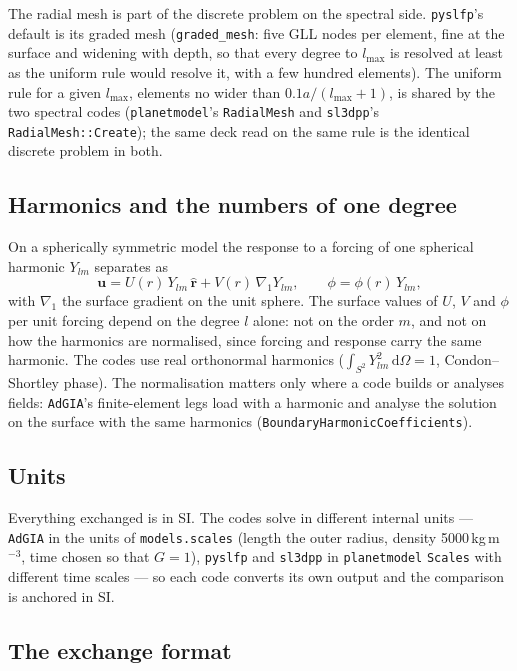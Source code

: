 \documentclass[11pt]{article}
\numberwithin{equation}{section}
\newcommand{\vu}{\mathbf{u}}
\newcommand{\rhat}{\hat{\mathbf{r}}}
\newcommand{\code}[1]{\texttt{#1}}
\newcommand{\Ylm}{Y_{lm}}
\newcommand{\gradone}{\nabla_{1}}
\begin{document}
The radial mesh is part of the discrete problem on the spectral side.
\code{pyslfp}'s default is its graded mesh (\code{graded\_mesh}: five GLL
nodes per element, fine at the surface and widening with depth, so that
every degree to $l_{\max}$ is resolved at least as the uniform rule would
resolve it, with a few hundred elements). The uniform rule for a given
$l_{\max}$, elements no wider than $0.1a/(l_{\max}+1)$, is shared by the two
spectral codes
(\code{planetmodel}'s \code{RadialMesh} and \code{sl3dpp}'s
\code{RadialMesh::Create}); the same deck read on the same rule is the
identical discrete problem in both.

\subsection{Harmonics and the numbers of one degree}
\label{sec:harmonics}

On a spherically symmetric model the response to a forcing of one
spherical harmonic $\Ylm$ separates as
\begin{equation}
  \vu = U(r)\,\Ylm\,\rhat + V(r)\,\gradone\Ylm,
  \qquad \phi = \phi(r)\,\Ylm,
  \label{eq:separation}
\end{equation}
with $\gradone$ the surface gradient on the unit sphere. The surface values
of $U$, $V$ and $\phi$ per unit forcing depend on the degree $l$ alone: not
on the order $m$, and not on how the harmonics are normalised, since forcing
and response carry the same harmonic. The codes use real orthonormal
harmonics ($\int_{S^2}\Ylm^2\,\mathrm{d}\Omega=1$, Condon--Shortley phase).
The normalisation matters only where a code builds or analyses fields:
\code{AdGIA}'s finite-element legs load with a harmonic and analyse the
solution on the surface with the same harmonics
(\code{BoundaryHarmonicCoefficients}).

\subsection{Units}
\label{sec:units}

Everything exchanged is in SI. The codes solve in different internal units
--- \code{AdGIA} in the units of \code{models.scales} (length the outer
radius, density 5000\,kg\,m$^{-3}$, time chosen so that $G=1$),
\code{pyslfp} and \code{sl3dpp} in \code{planetmodel} \code{Scales} with
different time scales --- so each code converts its own output and the
comparison is anchored in SI.

\subsection{The exchange format}
\label{sec:exchange}
\end{document}
